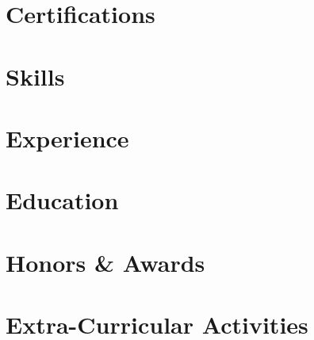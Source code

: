\documentclass[letter,10pt]{article}
\begin{document}
\thispagestyle{firstpage}



\section{Certifications}
% 


\section{Skills}


\section{Experience}


\thispagestyle{default}
\setlength{\headheight}{0.55in}
\setlength{\headsep}{0pt}

\section{Education}


\section{Honors \& Awards}


\section{Extra-Curricular Activities}

\end{document}
